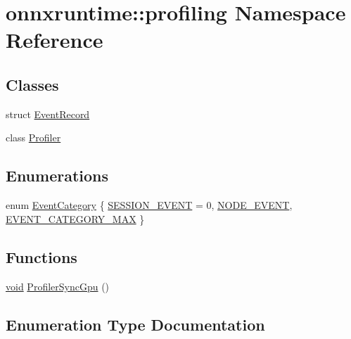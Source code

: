 \hypertarget{namespaceonnxruntime_1_1profiling}{}\section{onnxruntime\+:\+:profiling Namespace Reference}
\label{namespaceonnxruntime_1_1profiling}
\subsection*{Classes}
\begin{DoxyCompactItemize}
\item 
struct \mbox{\hyperlink{structonnxruntime_1_1profiling_1_1EventRecord}{Event\+Record}}
\item 
class \mbox{\hyperlink{classonnxruntime_1_1profiling_1_1Profiler}{Profiler}}
\end{DoxyCompactItemize}
\subsection*{Enumerations}
\begin{DoxyCompactItemize}
\item 
enum \mbox{\hyperlink{namespaceonnxruntime_1_1profiling_acbb1d7474c26b32c5bfef2ce1ab63734}{Event\+Category}} \{ \mbox{\hyperlink{namespaceonnxruntime_1_1profiling_acbb1d7474c26b32c5bfef2ce1ab63734a23da41e371db826aa8718219b26d1eb8}{S\+E\+S\+S\+I\+O\+N\+\_\+\+E\+V\+E\+NT}} = 0, 
\mbox{\hyperlink{namespaceonnxruntime_1_1profiling_acbb1d7474c26b32c5bfef2ce1ab63734a085893f1cd66aae0d2c86be51934a677}{N\+O\+D\+E\+\_\+\+E\+V\+E\+NT}}, 
\mbox{\hyperlink{namespaceonnxruntime_1_1profiling_acbb1d7474c26b32c5bfef2ce1ab63734aef479686347debcb6014fa0246610293}{E\+V\+E\+N\+T\+\_\+\+C\+A\+T\+E\+G\+O\+R\+Y\+\_\+\+M\+AX}}
 \}
\end{DoxyCompactItemize}
\subsection*{Functions}
\begin{DoxyCompactItemize}
\item 
\mbox{\hyperlink{mlasi_8h_a88f941d423cb2a819b70a1358982b1a6}{void}} \mbox{\hyperlink{namespaceonnxruntime_1_1profiling_aae85e4bd42cbc94f71a4e1891834b17f}{Profiler\+Sync\+Gpu}} ()
\end{DoxyCompactItemize}


\subsection{Enumeration Type Documentation}
\mbox{\label{namespaceonnxruntime_1_1profiling_acbb1d7474c26b32c5bfef2ce1ab63734}} 

